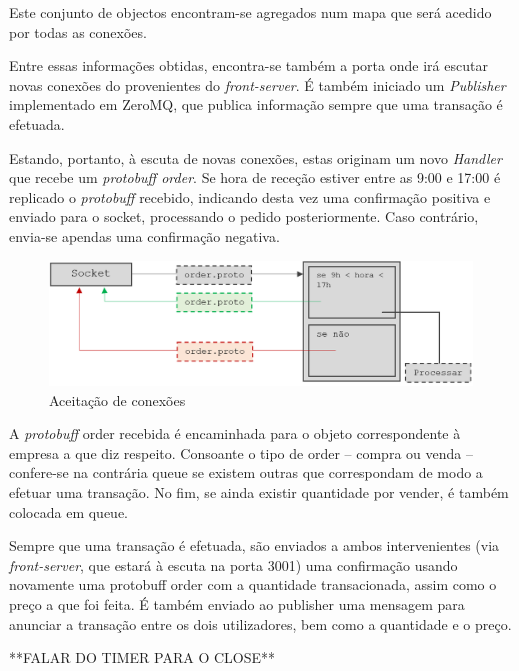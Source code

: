 \documentclass[a4paper,12pt]{article}
\begin{document}
\par Este conjunto de objectos encontram-se agregados num mapa que será acedido por todas as conexões. 

\par Entre essas informações obtidas, encontra-se também a porta onde irá escutar novas conexões do provenientes do \textit{front-server}. É também iniciado um \textit{Publisher} implementado em ZeroMQ, que publica informação sempre que uma transação é efetuada.

\par Estando, portanto, à escuta de novas conexões, estas originam um novo \textit{Handler} que recebe um \textit{protobuff order}. Se hora de receção estiver entre as 9:00 e 17:00 é replicado o \textit{protobuff} recebido, indicando desta vez uma confirmação positiva e enviado para o socket, processando o pedido posteriormente. Caso contrário, envia-se apendas uma confirmação negativa.

\begin{figure}[h]
  \centering
      \includegraphics[width=1\textwidth]{d1.PNG}
  \caption{Aceitação de conexões}
\end{figure}

\par A \textit{protobuff} order recebida é encaminhada para o objeto correspondente à empresa a que diz respeito. Consoante o tipo de order – compra ou venda – confere-se na contrária queue se existem outras que correspondam de modo a efetuar uma transação. No fim, se ainda existir quantidade por vender, é também colocada em queue.
\par Sempre que uma transação é efetuada, são enviados a ambos intervenientes (via \textit{front-server}, que estará à escuta na porta 3001) uma confirmação usando novamente uma protobuff order com a quantidade transacionada, assim como o preço a que foi feita.  É também enviado ao publisher uma mensagem para anunciar a transação entre os dois utilizadores, bem como a quantidade e o preço.  


**FALAR DO TIMER PARA O CLOSE**
\end{document}
